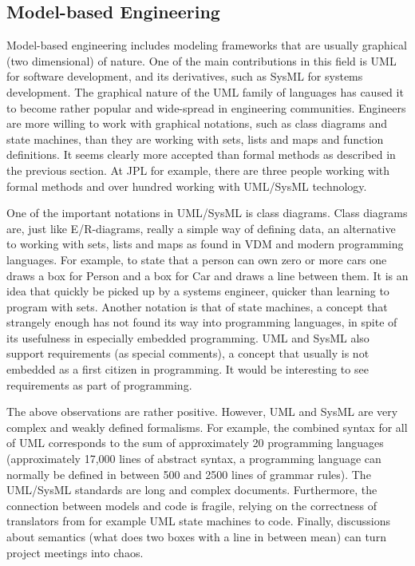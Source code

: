 \subsection{Model-based Engineering}

Model-based engineering includes modeling frameworks that are 
usually graphical (two dimensional) of nature. One of 
the main contributions 
in this field is UML for software development, and its derivatives, 
such as SysML for systems development. The graphical nature of the 
UML family of languages has caused it to become rather popular and 
wide-spread in engineering communities. Engineers are more willing 
to work with graphical notations, such as 
class diagrams and state machines, than they are working with sets, 
lists and maps and function definitions. It seems clearly more 
accepted than formal methods as described in the previous section. 
At JPL for example, there are three people working with formal 
methods and over hundred working with UML/SysML technology. 

One of the important notations in UML/SysML is class diagrams. 
Class diagrams are, just like E/R-diagrams, really a simple way 
of defining data, an alternative to working with sets, lists and 
maps as found in VDM and modern programming languages. For example, 
to state that a person can own zero or more cars one draws a box 
for Person and a box for Car and draws a line between them. It is 
an idea that quickly be picked up by a systems engineer, quicker 
than learning to program with sets. 
Another notation is that of state 
machines, a concept that strangely enough has not found its way 
into programming languages, in spite of its usefulness in 
especially embedded programming. UML and SysML also support 
requirements (as special comments), a concept that usually is not embedded as a first citizen in programming. 
It would be interesting to see requirements as part of programming.

The above observations are rather positive. However, UML and
SysML are very complex and weakly defined formalisms. 
For example, the combined syntax for all of UML corresponds 
to the sum of approximately 20 programming languages (approximately 
17,000 lines of abstract syntax, a programming language can 
normally be defined in between 500 and 2500 lines of grammar 
rules). The UML/SysML standards are long and complex documents. 
Furthermore, the connection between models and code is fragile, relying on the correctness of translators from for example UML state machines to code. Finally, discussions about semantics
(what does two boxes with a line in between mean) can turn 
project meetings into chaos.


